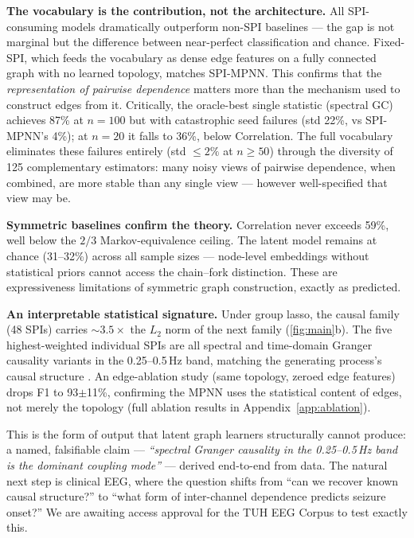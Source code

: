 \documentclass{article}
\begin{document}
\textbf{The vocabulary is the contribution, not the architecture.} All SPI-consuming models dramatically outperform non-SPI baselines --- the gap is not marginal but the difference between near-perfect classification and chance. Fixed-SPI, which feeds the vocabulary as dense edge features on a fully connected graph with no learned topology, matches SPI-MPNN. This confirms that the \emph{representation of pairwise dependence} matters more than the mechanism used to construct edges from it. Critically, the oracle-best single statistic (spectral GC) achieves 87\% at $n{=}100$ but with catastrophic seed failures (std 22\%, vs SPI-MPNN's 4\%); at $n{=}20$ it falls to 36\%, below Correlation. The full vocabulary eliminates these failures entirely (std ${\leq}2\%$ at $n {\geq} 50$) through the diversity of 125 complementary estimators: many noisy views of pairwise dependence, when combined, are more stable than any single view --- however well-specified that view may be.

\textbf{Symmetric baselines confirm the theory.} Correlation never exceeds 59\%, well below the $2/3$ Markov-equivalence ceiling. The latent model \citep[cf.][]{wu2019} remains at chance (31--32\%) across all sample sizes --- node-level embeddings without statistical priors cannot access the chain--fork distinction. These are expressiveness limitations of symmetric graph construction, exactly as predicted.

\textbf{An interpretable statistical signature.} Under group lasso, the causal family (48 SPIs) carries ${\sim}3.5{\times}$ the $L_2$ norm of the next family (\cref{fig:main}b). The five highest-weighted individual SPIs are all spectral and time-domain Granger causality variants in the 0.25--0.5\,Hz band, matching the generating process's causal structure \citep{geweke1982}. An edge-ablation study (same topology, zeroed edge features) drops F1 to 93$\pm$11\%, confirming the MPNN uses the statistical content of edges, not merely the topology (full ablation results in Appendix~\ref{app:ablation}).

This is the form of output that latent graph learners structurally cannot produce: a named, falsifiable claim --- \emph{``spectral Granger causality in the 0.25--0.5\,Hz band is the dominant coupling mode''} --- derived end-to-end from data. The natural next step is clinical EEG, where the question shifts from ``can we recover known causal structure?'' to ``what form of inter-channel dependence predicts seizure onset?'' We are awaiting access approval for the TUH EEG Corpus to test exactly this.
\end{document}

